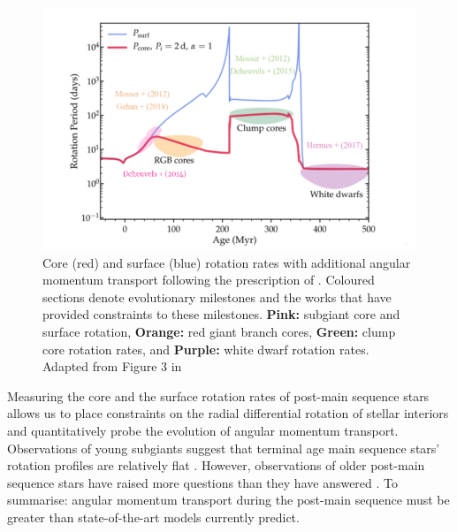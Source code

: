 \begin{figure}[h]
    \includegraphics[width=\textwidth]{Figures/intro_figures/qualitative_evo.png}
    \caption[Qualitative core and surface rotation rates of post-main sequence stars.]{Core (red) and surface (blue) rotation rates with additional angular momentum transport following the prescription of \citet{spada_angular_2016}. Coloured sections denote evolutionary milestones and the works that have provided constraints to these milestones. \textbf{Pink:} subgiant core and surface rotation, \textbf{Orange:} red giant branch cores, \textbf{Green:} clump core rotation rates, and \textbf{Purple:} white dwarf rotation rates. Adapted from Figure 3 in \citet{fuller_slowing_2019}}
    \label{fig:poms_evo}
\end{figure}


Measuring the core and the surface rotation rates of post-main sequence stars allows us to place constraints on the radial differential rotation of stellar interiors and quantitatively probe the evolution of angular momentum transport.
Observations of young subgiants suggest that terminal age main sequence stars' rotation profiles are relatively flat \citep{deheuvels_seismic_2020}.
However, observations of older post-main sequence stars have raised more questions than they have answered \citep{beck_fast_2012}.
To summarise: angular momentum transport during the post-main sequence must be greater than state-of-the-art models currently predict.

